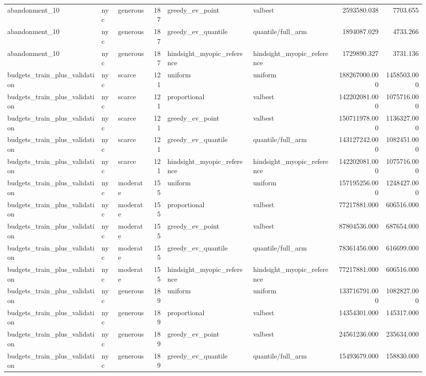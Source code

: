 \begin{tabular}{lllrllrr}
abandonment\_10 & nyc & generous & 187 & greedy\_ev\_point & valbest & 2593580.038 & 7703.655 \\
abandonment\_10 & nyc & generous & 187 & greedy\_ev\_quantile & quantile/full\_arm & 1894087.029 & 4733.266 \\
abandonment\_10 & nyc & generous & 187 & hindsight\_myopic\_reference & hindsight\_myopic\_reference & 1729890.327 & 3731.136 \\
budgets\_train\_plus\_validation & nyc & scarce & 121 & uniform & uniform & 188267000.000 & 1458503.000 \\
budgets\_train\_plus\_validation & nyc & scarce & 121 & proportional & valbest & 142202081.000 & 1075716.000 \\
budgets\_train\_plus\_validation & nyc & scarce & 121 & greedy\_ev\_point & valbest & 150711978.000 & 1136327.000 \\
budgets\_train\_plus\_validation & nyc & scarce & 121 & greedy\_ev\_quantile & quantile/full\_arm & 143127242.000 & 1082451.000 \\
budgets\_train\_plus\_validation & nyc & scarce & 121 & hindsight\_myopic\_reference & hindsight\_myopic\_reference & 142202081.000 & 1075716.000 \\
budgets\_train\_plus\_validation & nyc & moderate & 155 & uniform & uniform & 157195256.000 & 1248427.000 \\
budgets\_train\_plus\_validation & nyc & moderate & 155 & proportional & valbest & 77217881.000 & 606516.000 \\
budgets\_train\_plus\_validation & nyc & moderate & 155 & greedy\_ev\_point & valbest & 87804536.000 & 687654.000 \\
budgets\_train\_plus\_validation & nyc & moderate & 155 & greedy\_ev\_quantile & quantile/full\_arm & 78361456.000 & 616699.000 \\
budgets\_train\_plus\_validation & nyc & moderate & 155 & hindsight\_myopic\_reference & hindsight\_myopic\_reference & 77217881.000 & 606516.000 \\
budgets\_train\_plus\_validation & nyc & generous & 189 & uniform & uniform & 133716791.000 & 1082827.000 \\
budgets\_train\_plus\_validation & nyc & generous & 189 & proportional & valbest & 14354301.000 & 145317.000 \\
budgets\_train\_plus\_validation & nyc & generous & 189 & greedy\_ev\_point & valbest & 24561236.000 & 235634.000 \\
budgets\_train\_plus\_validation & nyc & generous & 189 & greedy\_ev\_quantile & quantile/full\_arm & 15493679.000 & 158830.000 \\

\end{tabular}
